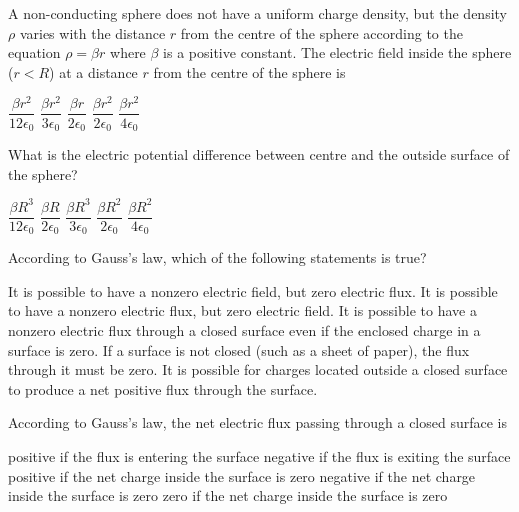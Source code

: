 \documentclass{../../../oss-apphys-exam}
\begin{document}

\raggedcolumns



\begin{questions}

  \question A non-conducting sphere does not have a uniform charge density, but
  the density $\rho$ varies with the distance $r$ from the centre of the
  sphere according to the equation $\rho=\beta r$ where $\beta$ is a positive
  constant. The electric field inside the sphere ($r<R$) at a distance $r$
  from the centre of the sphere is
  \begin{choices}
    \choice $\dfrac{\beta r^2}{12\epsilon_0}$
    \choice $\dfrac{\beta r^2}{3\epsilon_0}$
    \choice $\dfrac{\beta r}{2\epsilon_0}$
    \choice $\dfrac{\beta r^2}{2\epsilon_0}$
    \choice $\dfrac{\beta r^2}{4\epsilon_0}$
  \end{choices}
  
  \question What is the electric potential difference between centre and the
  outside surface of the sphere?
  \begin{choices}
    \choice $\dfrac{\beta R^3}{12\epsilon_0}$
    \choice $\dfrac{\beta R}{2\epsilon_0}$
    \choice $\dfrac{\beta R^3}{3\epsilon_0}$
    \choice $\dfrac{\beta R^2}{2\epsilon_0}$
    \choice $\dfrac{\beta R^2}{4\epsilon_0}$
  \end{choices}
    
  \question According to Gauss's law, which of the following statements is
  true?
  \begin{choices}
    \choice It is possible to have a nonzero electric field, but zero electric
    flux.
    \choice It is possible to have a nonzero electric flux, but zero electric
    field.
    \choice It is possible to have a nonzero electric flux through a closed
    surface even if the enclosed charge in a surface is zero.
    \choice If a surface is not closed (such as a sheet of paper), the flux
    through it must be zero.
    \choice It is possible for charges located outside a closed surface to
    produce a net positive flux through the surface.
  \end{choices}
    
  \question According to Gauss's law, the net electric flux passing through a
  closed surface is
  \begin{choices}
    \choice positive if the flux is entering the surface
    \choice negative if the flux is exiting the surface
    \choice positive if the net charge inside the surface is zero
    \choice negative if the net charge inside the surface is zero
    \choice zero if the net charge inside the surface is zero
  \end{choices}
    

\end{questions}
\end{document}
